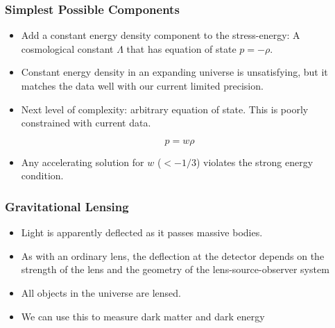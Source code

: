\documentclass{beamer}
\begin{document}
\frame
{
    \frametitle{Simplest Possible Components}

    \begin{itemize}

        \item Add a constant energy density component to the stress-energy:   A
            cosmological constant $\Lambda$ that has equation of
            state  $p=-\rho$.
            
        \item Constant energy density in an expanding universe is unsatisfying,
            but it matches the data well with our current limited precision.

        \item Next level of complexity: arbitrary equation of state.  This is
            poorly constrained with current data.

    \end{itemize}

    \begin{equation}
        p = w \rho
    \end{equation}

    \begin{itemize}
        \item Any accelerating solution for $w$ ($< - 1/3$) violates the strong energy condition.
    \end{itemize}

}



\frame
{
    \frametitle{Gravitational Lensing}

    \begin{itemize}

        \item Light is apparently deflected as it passes massive bodies.

        \item As with an ordinary lens, the deflection at the detector depends
            on the strength of the lens and the geometry of the
            lens-source-observer system

        \item All objects in the universe are lensed.

        \item We can use this to measure dark matter and dark energy

    \end{itemize}

}
\end{document}
